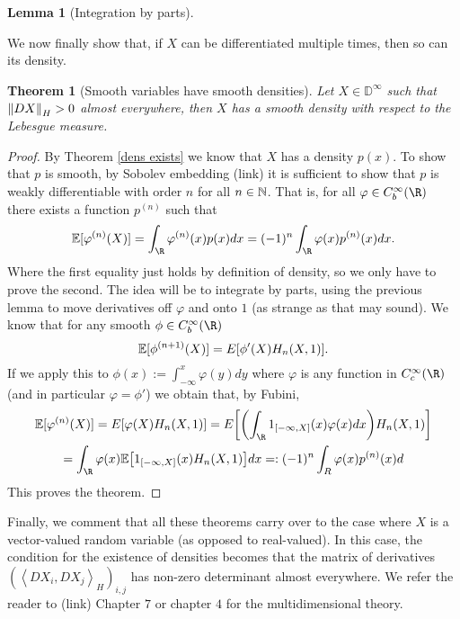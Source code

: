 \documentclass[12pt]{article}
\newtheorem{theorem}{Theorem}
\newtheorem{lemma}{Lemma}
\newcommand{\br}[1]{\left\langle#1\right\rangle}
\begin{document}
\begin{CJK*}{UTF8}{gbsn}
\begin{lemma}[Integration by parts]
	\end{lemma}
	We now finally show that, if $X$ can be differentiated multiple times, then so can its density.
	\begin{theorem}[Smooth variables have smooth densities]
		Let $X\in \mathbb{D}^\infty$ such that  $\norm{DX}_{H}>0$ almost everywhere, then $X$ has a smooth density with respect to the Lebesgue measure.
	\end{theorem}
	\begin{proof}
		By Theorem \ref{dens exists} we know that $X$ has a density  $p(x)$. To show that  $p$ is smooth, by Sobolev embedding (link) it is sufficient to show that $p$ is weakly differentiable with order $n$
		for all $n \in \mathbb{N}$. That is, for all $\varphi\in C_b^\infty(\R)$ there exists a function
		$p^{(n)}$ such that
		\begin{equation*}
			\E[\varphi^{(n)}(X)]=\int_{\R}\varphi^{(n)}(x)p(x) dx=(-1)^n\int_{\R}\varphi(x) p^{(n)}(x) dx.
		\end{equation*}
		Where the first equality just holds by definition of density, so we only have to prove the second. The idea will be to integrate by parts, using the previous lemma to move derivatives off $\varphi$ and onto $1$ (as strange as that may sound). We know that for any smooth $\phi\in C_b^\infty(\R)$
		\begin{equation*}
			\mathbb{E}[\phi^{(n+1)}(X)]=E[\phi'(X)H_n(X,1)].
		\end{equation*}
		If we apply this to $\phi(x):=\int_{-\infty}^x \varphi(y) dy$ where $\varphi$ is any function in $C_c^\infty(\R)$ (and in particular $\varphi=\phi'$) we obtain that, by Fubini,
		\begin{multline*}
			\E[\varphi^{(n)}(X)]=E[\varphi(X)H_n(X,1)]= E\qty[\qty(\int_{\R}1_{[-\infty,X]}(x) \varphi(x)dx) H_n(X,1)]\\=\int_{\R}\varphi(x)\E\qty[1_{[-\infty,X]}(x)H_n(X,1)] dx=:(-1)^n \int_{R}\varphi(x) p^{(n)}(x) d
		\end{multline*}
		This proves the theorem.
	\end{proof}
	Finally, we comment that all these theorems carry over to the case where $X$ is a vector-valued random variable (as opposed to real-valued). In this case, the condition
	for the existence of densities becomes that the matrix of derivatives $(\br{DX_i,DX_j}_{H})_{i,j}$ has non-zero determinant almost everywhere. We refer the reader to \cite{nualart2018introduction} (link)
	Chapter  $7$ or \cite{hairer2021introduction}  chapter $4$ for the multidimensional theory.

\end{CJK*}




\end{document}
